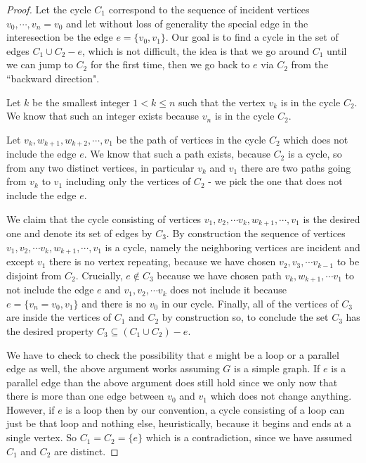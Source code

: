 \begin{proof}



Let the cycle $C_1$ correspond to the sequence of incident vertices  $v_0, \cdots, v_n = v_0$ and let without loss of generality the special edge in the interesection be the edge $e = \{v_0, v_1\}$. Our goal is to find a cycle in the set of edges $C_1 \cup C_2 -e$, which is not difficult, the idea is that we go around $C_1$ until we can jump to $C_2$ for the first time, then we go back to $e$ via $C_2$ from the ``backward direction".

Let $k$ be the smallest integer $1<k\leq n$ such that the vertex $v_k$ is in the cycle $C_2$. We know that such an integer exists because $v_n$ is in the cycle $C_2$. 

Let $v_k, w_{k+1}, w_{k+2}, \cdots, v_1$ be the path of vertices in the cycle $C_2$ which does not include the edge $e$. We know that such a path exists, because $C_2$ is a cycle, so from any two distinct vertices, in particular $v_k$ and $v_1$ there are two paths going from $v_k$ to $v_1$ including only the vertices of $C_2$ - we pick the one that does not include the edge $e$.

We claim that the cycle consisting of vertices $v_1, v_2, \cdots v_k, w_{k+1}, \cdots , v_1$ is the desired one and denote its set of edges by $C_3$. By construction the sequence of vertices $v_1, v_2, \cdots v_k, w_{k+1}, \cdots , v_1$ is a cycle, namely the neighboring vertices are incident and except $v_1$ there is no vertex repeating, because we have chosen $v_2, v_3, \cdots v_{k-1}$ to be disjoint from $C_2$. Crucially, $e \notin C_3$ because we have chosen path $v_k, w_{k+1}, \cdots v_1$ to not include the edge $e$ and $v_1, v_2, \cdots v_k$ does not include it because $e = \{v_n = v_0, v_1\}$ and there is no $v_0$ in our cycle. Finally, all of the vertices of $C_3$ are inside the vertices of $C_1$ and $C_2$ by construction so, to conclude the set $C_3$ has the desired property $C_3 \subseteq (C_1 \cup C_2) - e$.

We have to check to check the possibility that $e$ might be a loop or a parallel edge as well, the above argument works assuming $G$ is a simple graph. If $e$ is a parallel edge than the above argument does still hold since we only now that there is more than one edge between $v_0$
and $v_1$ which does not change anything. However, if $e$ is a loop then by our convention, a cycle consisting of a loop can just be that loop and nothing else, heuristically, because it begins and ends at a single vertex. So $C_1 = C_2 = \{e\}$ which is a contradiction, since we have assumed $C_1$ and $C_2$ are distinct.


\end{proof}
